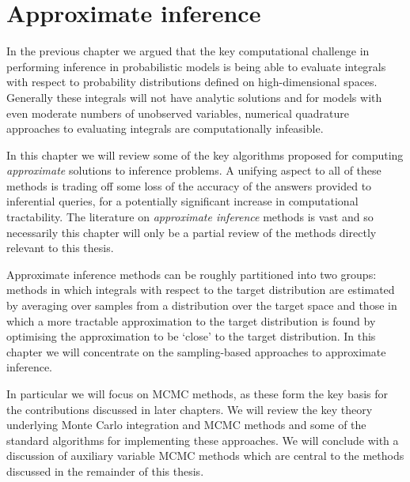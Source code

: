 \chapter{Approximate inference}\label{ch:approximate-inference}

\enlargethispage{\baselineskip}
In the previous chapter we argued that the key computational challenge in performing inference in probabilistic models is being able to evaluate integrals with respect to probability distributions defined on high-dimensional spaces. Generally these integrals will not have analytic solutions and for models with even moderate numbers of unobserved variables, numerical quadrature approaches to evaluating integrals are computationally infeasible. %

In this chapter we will review some of the key algorithms proposed for computing \emph{approximate} solutions to inference problems. A unifying aspect to all of these methods is trading off some loss of the accuracy of the answers provided to inferential queries, for a potentially significant increase in computational tractability. The literature on \emph{approximate inference} methods is vast and so necessarily this chapter will only be a partial review of the methods directly relevant to this thesis.

Approximate inference methods can be roughly partitioned into two groups: methods in which integrals with respect to the target distribution are estimated by averaging over samples from a distribution over the target space and those in which a more tractable approximation to the target distribution is found by optimising the approximation to be `close' to the target distribution. In this chapter we will concentrate on the sampling-based approaches to approximate inference. 

In particular we will focus on \ac{MCMC} methods, as these form the key basis for the contributions discussed in later chapters. We will review the key theory underlying Monte Carlo integration and \ac{MCMC} methods and some of the standard algorithms for implementing these approaches. We will conclude with a discussion of auxiliary variable \ac{MCMC} methods which are central to the methods discussed in the remainder of this thesis.   

